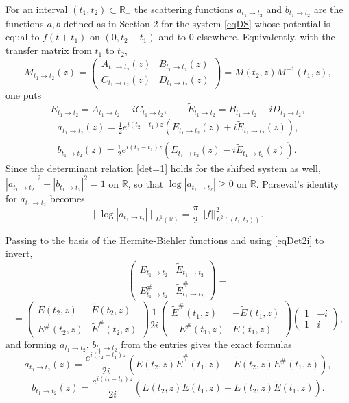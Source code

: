 \documentclass[11pt,twoside,reqno]{amsart}
\def\ti{\tilde}
\def\to{\rightarrow}
\def\R{{\mathbb R}}
\theoremstyle{plain}
\numberwithin{equation}{section}
\begin{document}
For an interval $(t_1,t_2)\subset \R_+$ the scattering functions $a_{t_1 \to t_2}$  and $b_{t_1 \to t_2}$ are the functions $a, b$ defined as in Section 2 for the system \eqref{eqDS} whose potential is equal to $f(t+t_1)$ on $(0, t_2-t_1)$ and to $0$ elsewhere. Equivalently, with the transfer matrix from $t_1$ to $t_2$,
$$M_{t_1 \to t_2}(z)=\begin{pmatrix} A_{t_1 \to t_2}(z) & B_{t_1 \to t_2}(z) \\ C_{t_1 \to t_2}(z) & D_{t_1 \to t_2}(z)\end{pmatrix}
=M(t_2,z)M^{-1}(t_1,z),
$$
one puts
$$E_{t_1 \to t_2}=A_{t_1 \to t_2}-iC_{t_1 \to t_2},\qquad \ti E_{t_1 \to t_2}=B_{t_1 \to t_2}-iD_{t_1 \to t_2},$$
$$\begin{gathered}
a_{t_1 \to t_2}(z)=\frac 12 e^{i(t_2-t_1)z}(E_{t_1 \to t_2}(z)+i \ti E_{t_1 \to t_2}(z)),\\
b_{t_1 \to t_2}(z)=\frac 12 e^{i(t_2-t_1)z}(E_{t_1 \to t_2}(z)-i \ti E_{t_1 \to t_2}(z)).
\end{gathered}$$
Since the determinant relation \eqref{det=1} holds for the shifted system as well, $|a_{t_1\to t_2}|^2-|b_{t_1\to t_2}|^2=1$ on $\R$, so that $\log|a_{t_1\to t_2}|\geq0$ on $\R$. Parseval's identity for $a_{t_1 \to t_2}$ becomes
\begin{equation}||\log |a_{t_1 \to t_2}|\ ||_{L^1(\R)}=\frac\pi2\,|| f||^2_{L^2((t_1,t_2))}.
\label{eqParsBlock}\end{equation}

Passing to the basis of the Hermite-Biehler functions and using \eqref{eqDet2i} to invert,
$$
\begin{pmatrix} E_{t_1 \to t_2} & \ti E_{t_1 \to t_2} \\ E^\#_{t_1 \to t_2} & \ti E^\#_{t_1 \to t_2} \end{pmatrix}
=$$
$$=\begin{pmatrix} E(t_2,z) &  \ti E(t_2,z) \\    E^\#(t_2,z) & \ti E^\#(t_2,z)\end{pmatrix}\frac 1{2i} \begin{pmatrix} \ti E^\#(t_1,z) & -\ti E(t_1,z) \\  -E^\#(t_1,z) & E(t_1,z) \end{pmatrix}
\begin{pmatrix} 1 & -i \\ 1 & i \end{pmatrix},
$$
and forming $a_{t_1\to t_2}$, $b_{t_1\to t_2}$ from the entries gives the exact formulas
\begin{equation}
a_{t_1 \to t_2}(z)=\frac {e^{i(t_2-t_1)z}}{2i}\left( E(t_2,z)\ti E^\#(t_1,z)-\ti E(t_2,z)E^\#(t_1,z) \right),
\label{eqablock}\end{equation}
\begin{equation}
b_{t_1 \to t_2}(z)=\frac {e^{i(t_2-t_1)z}}{2i}\left( \ti E(t_2,z)E(t_1,z)-E(t_2,z)\ti E(t_1,z)\right) .
\label{fin11}\end{equation}
\end{document}

